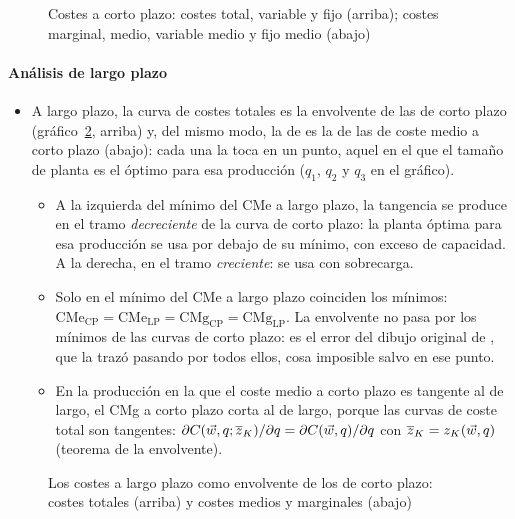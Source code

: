 \documentclass[11pt]{article}
\begin{document}
\begin{figure}[H]
\centering
\caption{Costes a corto plazo: costes total, variable y fijo (arriba); costes marginal, medio, variable medio y fijo medio (abajo)}\label{fig:costes-corto}
\end{figure}

\paragraph{Análisis de largo plazo}

\begin{itemize}
\item A largo plazo, la curva de costes totales es la envolvente de las de corto plazo (gráfico~\ref{fig:envolvente}, arriba) y, del mismo modo, la de  es la  de las de coste medio a corto plazo (abajo): cada una la toca en un punto, aquel en el que el tamaño de planta es el óptimo para esa producción ($q_1$, $q_2$ y $q_3$ en el gráfico).
  \begin{itemize}
  \item A la izquierda del mínimo del CMe a largo plazo, la tangencia se produce en el tramo \emph{decreciente} de la curva de corto plazo: la planta óptima para esa producción se usa por debajo de su mínimo, con exceso de capacidad. A la derecha, en el tramo \emph{creciente}: se usa con sobrecarga.
  \item Solo en el mínimo del CMe a largo plazo coinciden los mínimos: $\mathrm{CMe}_{\mathrm{CP}}=\mathrm{CMe}_{\mathrm{LP}}=\mathrm{CMg}_{\mathrm{CP}}=\mathrm{CMg}_{\mathrm{LP}}$. La envolvente no pasa por los mínimos de las curvas de corto plazo: es el error del dibujo original de \textcite{Viner1931Cost}, que la trazó pasando por todos ellos, cosa imposible salvo en ese punto.
  \item En la producción en la que el coste medio a corto plazo es tangente al de largo, el CMg a corto plazo corta al de largo, porque las curvas de coste total son tangentes: $\partial C(\vec{w},q;\overline{z}_K)/\partial q=\partial C(\vec{w},q)/\partial q$ con $\overline{z}_K=z_K(\vec{w},q)$ (teorema de la envolvente).
  \end{itemize}
\end{itemize}

\begin{figure}[H]
\centering
\caption{Los costes a largo plazo como envolvente de los de corto plazo: costes totales (arriba) y costes medios y marginales (abajo)}\label{fig:envolvente}
\end{figure}
\end{document}
